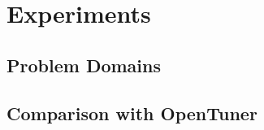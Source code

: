 \section{Experiments}
\label{sec:experiments}

\subsection{Problem Domains}
\subsection{Comparison with OpenTuner}
